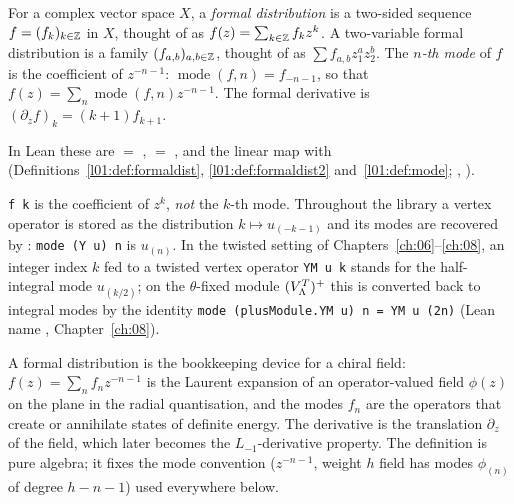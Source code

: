 \begin{definition}\label{ch09:def:fd}
For a complex vector space $X$, a \emph{formal distribution} is a two-sided sequence
$f=(f_k)_{k\in{\mathbb{Z}}}$ in $X$, thought of as $f(z)=\sum_{k\in{\mathbb{Z}}}f_k z^k$. A two-variable formal
distribution is a family $(f_{a,b})_{a,b\in{\mathbb{Z}}}$, thought of as $\sum f_{a,b}z_1^az_2^b$. The
\emph{$n$-th mode} of $f$ is the coefficient of $z^{-n-1}$:
$\operatorname{mode}(f,n)=f_{-n-1}$, so that $f(z)=\sum_n \operatorname{mode}(f,n)z^{-n-1}$. The
formal derivative is $(\partial_zf)_k=(k+1)f_{k+1}$.
\end{definition}

In Lean these are  $=$ ,  $=$
,  and the linear map  with
 (Definitions~\ref{l01:def:formaldist},
\ref{l01:def:formaldist2} and~\ref{l01:def:mode}; ,
).

\begin{dictionary}
\texttt{f k} is the coefficient of $z^k$, \emph{not} the $k$-th mode. Throughout the library
a vertex operator is stored as the distribution $k\mapsto u_{(-k-1)}$ and its modes are recovered
by : \texttt{mode (Y u) n} is $u_{(n)}$. In the twisted setting of
Chapters~\ref{ch:06}--\ref{ch:08}, an integer index $k$ fed to a twisted vertex operator
\texttt{YM u k} stands for the half-integral mode $u_{(k/2)}$; on the $\theta$-fixed module
$(V_{\Lambda}^{T})^{+}$ this is converted back to integral modes by the identity
\texttt{mode (plusModule.YM u) n = YM u (2n)} (Lean name , Chapter~\ref{ch:08}).
\end{dictionary}

\begin{physics}
A formal distribution is the bookkeeping device for a chiral field: $f(z)=\sum_n f_nz^{-n-1}$ is the Laurent expansion of an operator-valued field $\phi(z)$ on the plane in the radial quantisation, and the modes $f_n$ are the operators that create or annihilate states of definite energy. The derivative is the translation $\partial_z$ of the field, which later becomes the $L_{-1}$-derivative property. The definition is pure algebra; it fixes the mode convention ($z^{-n-1}$, weight $h$ field has modes $\phi_{(n)}$ of degree $h-n-1$) used everywhere below.
\end{physics}

